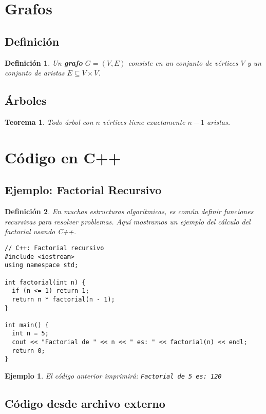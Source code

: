 \documentclass[11pt]{article}
\newtheorem{definition}{Definición}[section]
\newtheorem{theorem}{Teorema}[section]
\newtheorem{example}{Ejemplo}[section]
\begin{document}
\section{Grafos}
\subsection{Definición}
\begin{definition}
Un \textbf{grafo} $G = (V, E)$ consiste en un conjunto de vértices $V$ y un conjunto de aristas $E \subseteq V \times V$.
\end{definition}

\subsection{Árboles}
\begin{theorem}
Todo árbol con $n$ vértices tiene exactamente $n - 1$ aristas.
\end{theorem}

\section{Código en C++}
\subsection{Ejemplo: Factorial Recursivo}

\begin{definition}
En muchas estructuras algorítmicas, es común definir funciones recursivas para resolver problemas. Aquí mostramos un ejemplo del cálculo del factorial usando C++.
\end{definition}

\begin{lstlisting}
// C++: Factorial recursivo
#include <iostream>
using namespace std;

int factorial(int n) {
  if (n <= 1) return 1;
  return n * factorial(n - 1);
}

int main() {
  int n = 5;
  cout << "Factorial de " << n << " es: " << factorial(n) << endl;
  return 0;
}
\end{lstlisting}

\begin{example}
El código anterior imprimirá: \texttt{Factorial de 5 es: 120}
\end{example}

\subsection{Código desde archivo externo}

\end{document}
